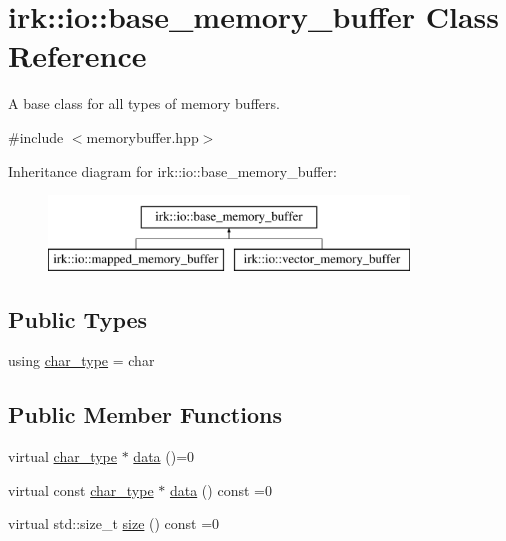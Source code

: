\hypertarget{classirk_1_1io_1_1base__memory__buffer}{}\section{irk\+:\+:io\+:\+:base\+\_\+memory\+\_\+buffer Class Reference}
\label{classirk_1_1io_1_1base__memory__buffer}


A base class for all types of memory buffers.  




{\ttfamily \#include $<$memorybuffer.\+hpp$>$}

Inheritance diagram for irk\+:\+:io\+:\+:base\+\_\+memory\+\_\+buffer\+:\begin{figure}[H]
\begin{center}
\leavevmode
\includegraphics[height=2.000000cm]{classirk_1_1io_1_1base__memory__buffer}
\end{center}
\end{figure}
\subsection*{Public Types}
\begin{DoxyCompactItemize}
\item 
using \mbox{\hyperlink{classirk_1_1io_1_1base__memory__buffer_a1b539180df4274dd4ad0402a0ac821ec}{char\+\_\+type}} = char
\end{DoxyCompactItemize}
\subsection*{Public Member Functions}
\begin{DoxyCompactItemize}
\item 
virtual \mbox{\hyperlink{classirk_1_1io_1_1base__memory__buffer_a1b539180df4274dd4ad0402a0ac821ec}{char\+\_\+type}} $\ast$ \mbox{\hyperlink{classirk_1_1io_1_1base__memory__buffer_ae8247b83aae579cbc04b5432bd4858cc}{data}} ()=0
\item 
virtual const \mbox{\hyperlink{classirk_1_1io_1_1base__memory__buffer_a1b539180df4274dd4ad0402a0ac821ec}{char\+\_\+type}} $\ast$ \mbox{\hyperlink{classirk_1_1io_1_1base__memory__buffer_a87bbff1a6d211e26f0c0aa924a980b9e}{data}} () const =0
\item 
virtual std\+::size\+\_\+t \mbox{\hyperlink{classirk_1_1io_1_1base__memory__buffer_ae634ab934981e7e4baf5e1e67ef3b006}{size}} () const =0
\end{DoxyCompactItemize}


